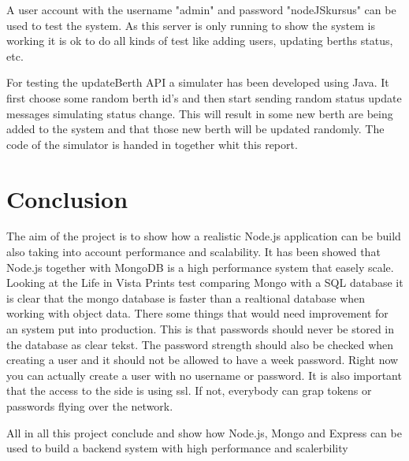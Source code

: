 \documentclass[a4paper,12pt,english]{article}
\begin{document}
A user account with the username "admin" and password "nodeJSkursus" can be used to test the system. As this server is only running to show the system is working it is ok to do all kinds of test like adding users, updating berths status, etc.

For testing the updateBerth API a simulater has been developed using Java.
It first choose some random berth id's and then start sending random status update messages simulating status change. This will result in some new berth are being added to the system and that those new berth will be updated randomly. The code of the simulator is handed in together whit this report.
\clearpage
\section{Conclusion}
The aim of the project is to show how a realistic Node.js application can be build also taking into account performance and scalability. It has been showed that Node.js together with MongoDB is a high performance system that easely scale. Looking at the Life in Vista Prints test \cite{mongotest} comparing Mongo with a SQL database it
is clear that the mongo database is faster than a realtional database when
working with object data.
There some things that would need improvement for an system put into production. This is that passwords should never be stored in the database as clear tekst. The password strength should also be checked when creating a user and it should not be allowed to have a week password. Right now you can actually create a user with no username or password. It is also important that the access to the side is using ssl. If not, everybody can grap tokens or passwords flying over the network. 

All in all this project conclude and show how Node.js, Mongo and Express can be used to build a backend system with high performance and scalerbility
\clearpage
\end{document}
